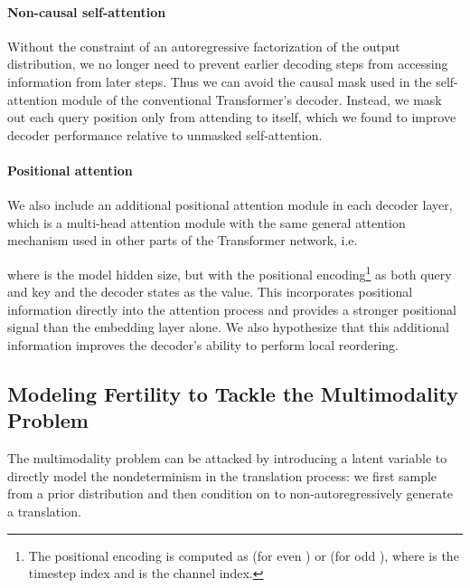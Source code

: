 \documentclass{article} \usepackage{iclr2018_conference,times}
\begin{document}
\vspace{-5pt}
\paragraph{Non-causal self-attention}
Without the constraint of an autoregressive factorization of the output distribution, we no longer need to prevent earlier decoding steps from accessing information from later steps. Thus we can avoid the causal mask used in the self-attention module of the conventional Transformer's decoder. Instead, we  mask out each query position only from attending to itself, which we found to improve decoder performance relative to unmasked self-attention.

\vspace{-5pt}
\paragraph{Positional attention}
We also include an additional positional attention module in each decoder layer, which is a multi-head attention module with the same general attention mechanism used in other parts of the Transformer network, i.e.

where  is the model hidden size, but with the positional encoding\footnote{The positional encoding  is computed as  (for even ) or  (for odd ), where  is the timestep index and  is the channel index.} as both query and key and the decoder states as the value. This incorporates positional information directly into the attention process and provides a stronger positional signal than the embedding layer alone. We also hypothesize that this additional information improves the decoder's ability to perform local reordering.

\subsection{Modeling Fertility to Tackle the Multimodality Problem}
\label{sec.fertility}

The multimodality problem can be attacked by introducing a latent variable  to directly model the nondeterminism in the translation process: we first sample  from a prior distribution and then condition on  to non-autoregressively generate a translation.
\end{document}
